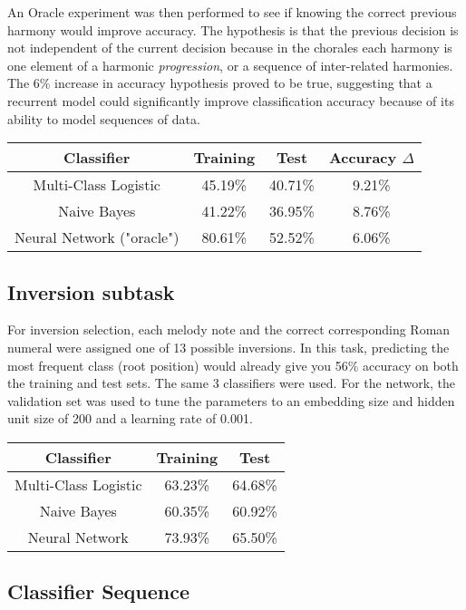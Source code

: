 \documentclass[12pt]{article}
\begin{document}
An Oracle experiment was then performed to see if knowing the correct previous harmony would improve accuracy. The hypothesis is that the previous decision is not independent of the current decision because in the chorales each harmony is one element of a harmonic \textit{progression}, or a sequence of inter-related harmonies. The 6\% increase in accuracy hypothesis proved to be true, suggesting that a recurrent model could significantly improve classification accuracy because of its ability to model sequences of data.

\begin{center}
	\begin{tabular}{ c | c | c | c }
		\textbf{Classifier} & \textbf{Training} & \textbf{Test} & \textbf{Accuracy $\Delta$}\\ \hline
		Multi-Class Logistic & 45.19\% & 40.71\% & 9.21\% \\ \hline
		Naive Bayes & 41.22\% & 36.95\% & 8.76\% \\ \hline
		Neural Network ("oracle") & 80.61\% & 52.52\% & 6.06\%
	\end{tabular}
\end{center}


\subsection{Inversion subtask}

For inversion selection, each melody note and the correct corresponding Roman numeral were assigned one of 13 possible inversions. In this task, predicting the most frequent class (root position) would already give you 56\% accuracy on both the training and test sets. The same 3 classifiers were used. For the network, the validation set was used to tune the parameters to an embedding size and hidden unit size of 200 and a learning rate of 0.001.

\begin{center}
	\begin{tabular}{ c | c | c }
		\textbf{Classifier} & \textbf{Training} & \textbf{Test} \\ \hline
		Multi-Class Logistic & 63.23\% & 64.68\% \\ \hline
		Naive Bayes & 60.35\% & 60.92\% \\ \hline
		Neural Network & 73.93\% & 65.50\%
	\end{tabular}
\end{center}

\subsection{Classifier Sequence}
\end{document}
